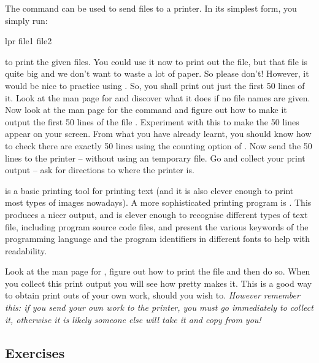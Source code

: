 The command  can be used to send files to a printer. In its
simplest form, you simply run:
%
\begin{ttoutenv}
  lpr file1 file2
\end{ttoutenv}
%
to print the given files. You could use it now to print out the
 file, but that file is quite big and we don't want to waste
a lot of paper. So please don't! However, it would be nice to practice using
. So, you shall print out just the first 50 lines of it. Look at
the man page for  and discover what it does if no file names are
given. Now look at the man page for the command  and figure out
how to make it output the first 50 lines of the file .
Experiment with this to make the 50 lines appear on your screen. From what you
have already learnt, you should know how to check there are exactly 50 lines
using the counting option of . Now send the 50 lines to the
printer -- without using an temporary file. Go and collect your print output
-- ask for directions to where the printer is.
%

 is a basic printing tool for printing text (and it is also
clever enough to print most types of images nowadays). A more sophisticated
printing program is . This produces a nicer output, and is
clever enough to recognise different types of text file, including program
source code files, and present the various keywords of the programming
language and the program identifiers in different fonts to help with
readability.

Look at the man page for , figure out how to print the file
 and then do so. When you collect
this print output you will see how pretty  makes it. This is a
good way to obtain print outs of your own work, should you wish to.
\emph{However remember this: if you send your own work to the printer, you
must go immediately to collect it, otherwise it is likely someone else will
take it and copy from you!}
\subsection{Exercises}

